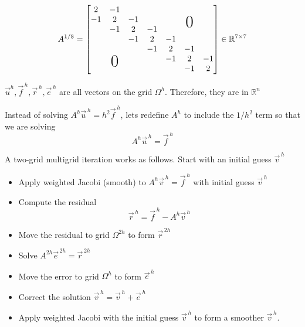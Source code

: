 \begin{equation*}
A^{1/8} = \begin{bmatrix}
  2  & -1      &     &     &     &         &  \\
  -1 & 2       & -1  &     &     &\bigzero &  \\
     &  -1     & 2   &-1   &     &         &  \\
     &         &  -1 & 2   &-1   &         &  \\
     &         &     &  -1 & 2   &-1       &  \\
     &\bigzero &     &     &  -1 & 2       &-1\\
     &         &     &     &     &  -1     & 2
\end{bmatrix}
\in \mathbb{R}^{7 \times 7}
\end{equation*}

$\vec{u}^h, \vec{f}^{\,h}, \vec{r}^{\,h}, \vec{e}^{\,h}$ are all vectors on the grid $\Omega^h$.
Therefore, they are in $\mathbb{R}^{n}$

Instead of solving $A^h\vec{u}^{\,h}=h^2\vec{f}^{\,h}$, lets redefine $A^{h}$ to
include the $1/h^2$ term so that we are solving
\begin{equation*}
  A^h\vec{u}^{\,h} = \vec{f}^{\,h}
\end{equation*}


A two-grid multigrid iteration works as follows. Start with an initial guess $\vec{v}^{\,h}$

\begin{itemize}
\item {}Apply weighted Jacobi (smooth) to $A^h\vec{v}^{\,h} =\vec{f}^{\,h}$ with
  initial guess $\vec{v}^{\,h}$ 
\item Compute the residual
  \begin{equation*}
\vec{r}^{\,h} = \vec{f}^{\,h} - A^h \vec{v}^{\,h}
  \end{equation*}
\item {}Move the residual to grid $\Omega^{2h}$ to form $\vec{r}^{\,2h}$
\item {}Solve $A^{2h}\vec{e}^{\,2h} = \vec{r}^{\,2h}$
\item {}Move the error to grid $\Omega^h$ to form $\vec{e}^{\,h}$
\item Correct the solution $\vec{v}^{\,h} = \vec{v}^{\,h} + \vec{e}^{\,h}$
\item {}Apply weighted Jacobi with the initial guess $\vec{v}^{\,h}$ to form a
  smoother $\vec{v}^{\,h}$.
\end{itemize}


